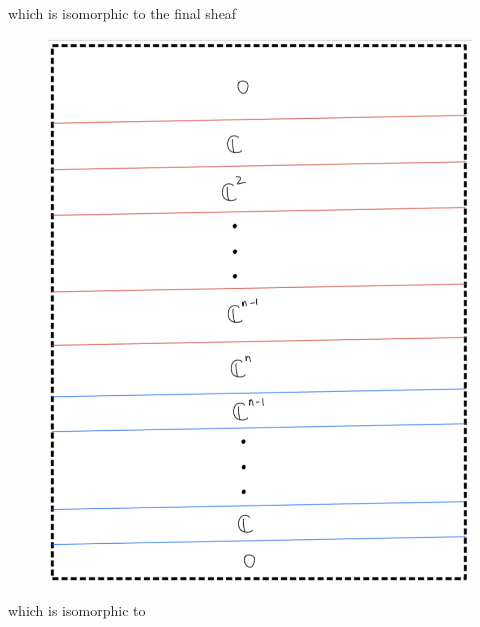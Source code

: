 \begin{enumerate}[label = (\roman*)]
\begin{enumerate}[label = (Step \arabic*)]
which is isomorphic to the final sheaf
\begin{figure}[H]
    \centering
    \includegraphics[scale = 0.95]{diagrams/cobord_inter/7.png}
    \caption{}
    \label{fig:your-label}
\end{figure}
which is isomorphic to
\begin{figure}[H]
    \centering

\end{figure}
\end{enumerate}
\end{enumerate}
